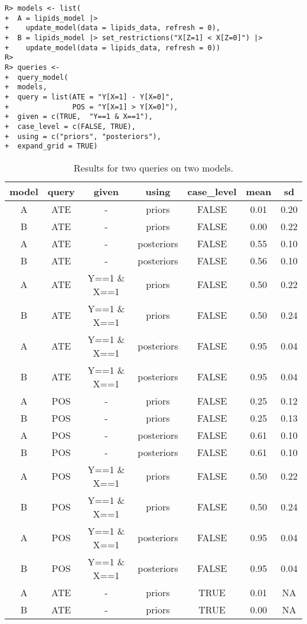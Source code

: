 \documentclass[
  11pt,
  article]{jss}
\begin{document}
\begin{verbatim}
R> models <- list(
+  A = lipids_model |> 
+    update_model(data = lipids_data, refresh = 0),
+  B = lipids_model |> set_restrictions("X[Z=1] < X[Z=0]") |>
+    update_model(data = lipids_data, refresh = 0))
R> 
R> queries <- 
+  query_model(
+  models,
+  query = list(ATE = "Y[X=1] - Y[X=0]", 
+               POS = "Y[X=1] > Y[X=0]"),
+  given = c(TRUE,  "Y==1 & X==1"),
+  case_level = c(FALSE, TRUE),
+  using = c("priors", "posteriors"),
+  expand_grid = TRUE)
\end{verbatim}

\hypertarget{tbl-batch-query}{}
\begin{longtable}[t]{ccccccc}
\caption{\label{tbl-batch-query}Results for two queries on two models. }\tabularnewline

\toprule
model & query & given & using & case\_level & mean & sd\\
\midrule
A & ATE & - & priors & FALSE & 0.01 & 0.20\\
B & ATE & - & priors & FALSE & 0.00 & 0.22\\
A & ATE & - & posteriors & FALSE & 0.55 & 0.10\\
B & ATE & - & posteriors & FALSE & 0.56 & 0.10\\
A & ATE & Y==1 \& X==1 & priors & FALSE & 0.50 & 0.22\\
\addlinespace
B & ATE & Y==1 \& X==1 & priors & FALSE & 0.50 & 0.24\\
A & ATE & Y==1 \& X==1 & posteriors & FALSE & 0.95 & 0.04\\
B & ATE & Y==1 \& X==1 & posteriors & FALSE & 0.95 & 0.04\\
A & POS & - & priors & FALSE & 0.25 & 0.12\\
B & POS & - & priors & FALSE & 0.25 & 0.13\\
\addlinespace
A & POS & - & posteriors & FALSE & 0.61 & 0.10\\
B & POS & - & posteriors & FALSE & 0.61 & 0.10\\
A & POS & Y==1 \& X==1 & priors & FALSE & 0.50 & 0.22\\
B & POS & Y==1 \& X==1 & priors & FALSE & 0.50 & 0.24\\
A & POS & Y==1 \& X==1 & posteriors & FALSE & 0.95 & 0.04\\
\addlinespace
B & POS & Y==1 \& X==1 & posteriors & FALSE & 0.95 & 0.04\\
A & ATE & - & priors & TRUE & 0.01 & NA\\
B & ATE & - & priors & TRUE & 0.00 & NA\\

\end{longtable}
\end{document}
